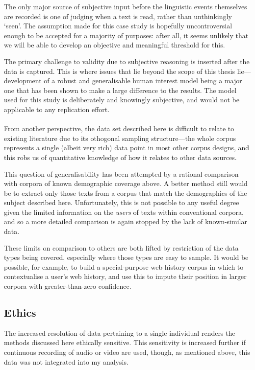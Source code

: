 The only major source of subjective input before the linguistic events themselves are recorded is one of judging when a text is read, rather than unthinkingly `seen'.  The assumption made for this case study is hopefully uncontroversial enough to be accepted for a majority of purposes: after all, it seems unlikely that we will be able to develop an objective and meaningful threshold for this.

The primary challenge to validity due to subjective reasoning is inserted after the data is captured.  This is where issues that lie beyond the scope of this thesis lie---development of a robust and generalisable human interest model being a major one that has been shown to make a large difference to the results.  The model used for this study is deliberately and knowingly subjective, and would not be applicable to any replication effort.

\paragraph{}
From another perspective, the data set described here is difficult to relate to existing literature due to its othogonal sampling structure---the whole corpus represents a single (albeit very rich) data point in most other corpus designs, and this robs us of quantitative knowledge of how it relates to other data sources.

This question of generalisability has been attempted by a rational comparison with corpora of known demographic coverage above.  A better method still would be to extract only those texts from a corpus that match the demographics of the subject described here.  Unfortunately, this is not possible to any useful degree given the limited information on the \textit{users} of texts within conventional corpora, and so a more detailed comparison is again stopped by the lack of known-similar data.

These limits on comparison to others are both lifted by restriction of the data types being covered, especially where those types are easy to sample.  It would be possible, for example, to build a special-purpose web history corpus in which to contextualise a user's web history, and use this to impute their position in larger corpora with greater-than-zero confidence.






\subsection{Ethics}
\label{sec:personal:discussion:ethics}
The increased resolution of data pertaining to a single individual renders the methods discussed here ethically sensitive.  This sensitivity is increased further if continuous recording of audio or video are used, though, as mentioned above, this data was not integrated into my analysis.

